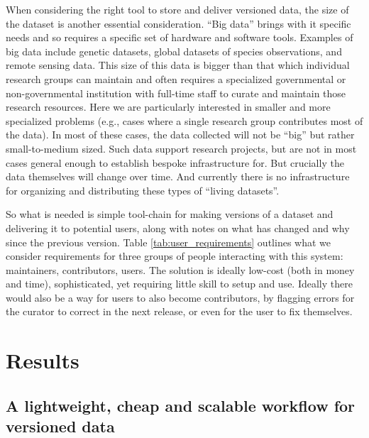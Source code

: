 \documentclass[a4paper,11pt]{article}
\begin{document}
When considering the right tool to store and deliver versioned data, the size
of the dataset is another essential consideration. ``Big data'' brings with it
specific needs and so requires a specific set of hardware and software tools.
Examples of big data include genetic datasets, global datasets of species
observations, and remote sensing data. This size of this data is bigger than
that which individual research groups can maintain and often requires a
specialized governmental or non-governmental institution with full-time staff
to curate and maintain those research resources. Here we are particularly
interested in smaller and more specialized problems (e.g., cases where a single 
research group contributes most of the data). In most of these cases, the data
collected will not be ``big'' but rather small-to-medium sized. Such data
support research projects, but are not in most cases general enough to
establish bespoke infrastructure for. But crucially the data themselves will change
over time. And currently there is no infrastructure for organizing and
distributing these types of ``living datasets''.

So what is needed is simple tool-chain for
making versions of a dataset and delivering it to potential users, along
with notes on what has changed and why since the previous version.
Table \ref{tab:user_requirements} outlines what we consider requirements for
three groups of people interacting with this system: maintainers,
contributors, users. The solution is ideally low-cost (both in money and
time), sophisticated, yet requiring little skill to setup and use.  Ideally
there would also be a way for users to also become contributors, by flagging
errors for the curator to correct in the next release, or even for the user to
fix themselves.


\section{Results}

\subsection{A lightweight, cheap and scalable workflow for versioned data}
\end{document}

